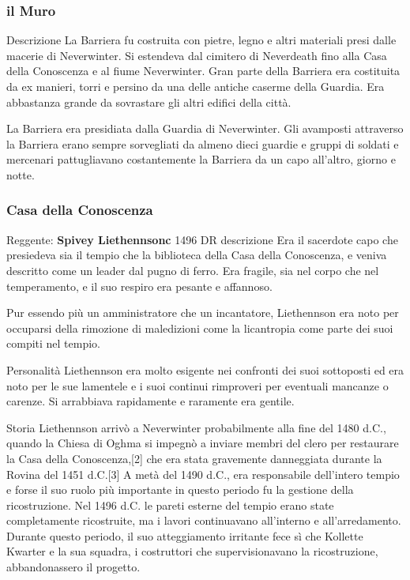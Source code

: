 \documentclass{article}
\begin{document}
              \subsubsection{il Muro}
Descrizione
La Barriera fu costruita con pietre, legno e altri materiali presi dalle macerie di Neverwinter. Si estendeva dal cimitero di Neverdeath fino alla Casa della Conoscenza e al fiume Neverwinter. Gran parte della Barriera era costituita da ex manieri, torri e persino da una delle antiche caserme della Guardia. Era abbastanza grande da sovrastare gli altri edifici della città.

La Barriera era presidiata dalla Guardia di Neverwinter. Gli avamposti attraverso la Barriera erano sempre sorvegliati da almeno dieci guardie e gruppi di soldati e mercenari pattugliavano costantemente la Barriera da un capo all'altro, giorno e notte.

              \subsubsection{Casa della Conoscenza}

Reggente: \textbf{Spivey Liethennsonc} 1496 DR
descrizione\newline
Era il sacerdote capo che presiedeva sia il tempio che la biblioteca della Casa della Conoscenza, e veniva descritto come un leader dal pugno di ferro. Era fragile, sia nel corpo che nel temperamento, e il suo respiro era pesante e affannoso.

Pur essendo più un amministratore che un incantatore, Liethennson era noto per occuparsi della rimozione di maledizioni come la licantropia come parte dei suoi compiti nel tempio.\newline

Personalità\newline
Liethennson era molto esigente nei confronti dei suoi sottoposti ed era noto per le sue lamentele e i suoi continui rimproveri per eventuali mancanze o carenze. Si arrabbiava rapidamente e raramente era gentile.\newline

Storia
Liethennson arrivò a Neverwinter probabilmente alla fine del 1480 d.C., quando la Chiesa di Oghma si impegnò a inviare membri del clero per restaurare la Casa della Conoscenza,[2] che era stata gravemente danneggiata durante la Rovina del 1451 d.C.[3] A metà del 1490 d.C., era responsabile dell'intero tempio e forse il suo ruolo più importante in questo periodo fu la gestione della ricostruzione. Nel 1496 d.C. le pareti esterne del tempio erano state completamente ricostruite, ma i lavori continuavano all'interno e all'arredamento. Durante questo periodo, il suo atteggiamento irritante fece sì che Kollette Kwarter e la sua squadra, i costruttori che supervisionavano la ricostruzione, abbandonassero il progetto.\newline
\end{document}
